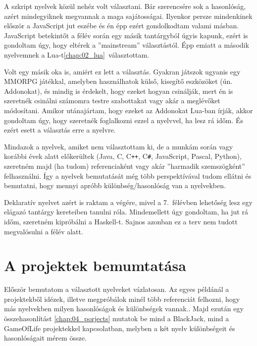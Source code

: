 A szkript nyelvek közül nehéz volt választani. Bár szerencsére sok a hasonlóság, azért mindegyiknek megvannak a maga sajátosságai. Ilyenkor persze mindenkinek először a JavaScript jut eszébe és én épp ezért gondolkodtam valami másban. JavaScript betekintőt a félév során egy másik tantárgyból úgyis kapunk, ezért is gondoltam úgy, hogy eltérek a ''mainstream'' választástól. Épp emiatt a második nyelvemnek a Lua-t\ref{chap:02_lua}~választottam. 

Volt egy másik oka is, amiért ez lett a választás. Gyakran játszok ugyanis egy MMORPG játékkal, amelyben használhatok külső, kisegítő eszközöket (ún. Addonokat), és mindig is érdekelt, hogy ezeket hogyan csinálják, mert én is szeretnék csinálni számomra testre szabottakat vagy akár a meglévőket módosítani. Amikor utánajártam, hogy ezeket az Addonokat Lua-ban írják, akkor gondoltam úgy, hogy szeretnék foglalkozni ezzel a nyelvvel, ha lesz rá időm. És ezért esett a választás erre a nyelvre.

Mindazok a nyelvek, amiket nem választottam ki, de a munkám során vagy korábbi évek alatt előkerültek (Java, C, C\verb|++|, C\verb|#|, JavaScript, Pascal, Python), szeretném majd (ha tudom) referenciaként vagy akár ''harmadik szemszögként'' felhasználni. Így a nyelvek bemutatását még több perspektívával tudom ellátni és bemutatni, hogy mennyi apróbb különbség/hasonlóság van a nyelvekben.

Deklaratív nyelvet azért is raktam a végére, mivel a 7.~félévben lehetőség lesz egy elágazó tantárgy kereteiben tanulni róla. Mindemellett úgy gondoltam, ha jut rá időm, szeretném kipróbálni a Haskell-t. Sajnos azonban ez a terv nem tudott megvalósulni a félév alatt.


\section{A projektek bemumtatása}

Először bemutatom a választott nyelveket vázlatosan. Az egyes példánál a projektekből idézek, illetve megpróbálok minél több referenciát felhozni, hogy más nyelvekben milyen hasonlóságok és különbségek vannak.. Majd ezután egy összehasonlítást \ref{chap:04_porjects} mutatok be mind a BlackJack, mind a GameOfLife projektekkel kapcsolatban, melyben a két nyelv különbségeit és hasonlóságait mérem össze.
 
